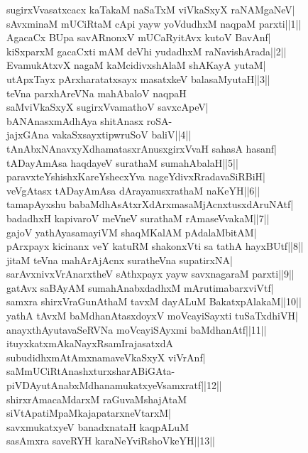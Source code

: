 \documentclass{article}
\begin{document}
sugirxVvasatxcacx kaTakaM naSaTxM viVkaSxyX raNAMgaNeV|\\
sAvxminaM mUCiRtaM cApi yayw yoVdudhxM naqpaM parxti||1||\\
AgacaCx BUpa savARnonxV mUCaRyitAvx kutoV BavAnf|\\
kiSxparxM gacaCxti mAM deVhi yudadhxM raNavishArada||2||\\
EvamukAtxvX nagaM kaMcidivxshAlaM shAKayA yutaM|\\
utApxTayx pArxharatatxsayx masatxkeV balasaMyutaH||3||\\
teVna parxhAreVNa mahAbaloV naqpaH\\
saMviVkaSxyX sugirxVvamathoV savxcApeV|\\
bANAnasxmAdhAya shitAnasx roSA-\\
jajxGAna vakaSxsayxtipwruSoV baliV||4||\\
tAnAbxNAnavxyXdhamatasxrAnusxgirxVvaH sahasA hasanf|\\
tADayAmAsa haqdayeV surathaM sumahAbalaH||5||\\
paravxteYshishxKareYshecxYva nageYdivxRradavaSiRBiH|\\
veVgAtasx tADayAmAsa dArayanusxrathaM naKeYH||6||\\
tamapAyxshu babaMdhAsAtxrXdArxmasaMjAcnxtusxdAruNAtf|\\
badadhxH kapivaroV meVneV surathaM rAmaseVvakaM||7||\\
gajoV yathAyasamayiVM shaqMKalAM pAdalaMbitAM|\\
pArxpayx kicinanx veY katuRM shakonxVti sa tathA hayxBUtf||8||\\
jitaM teVna mahArAjAcnx suratheVna supatirxNA|\\
sarAvxnivxVrAnarxtheV sAthxpayx yayw savxnagaraM parxti||9||\\
gatAvx saBAyAM sumahAnabxdadhxM mArutimabarxviVtf|\\
samxra shirxVraGunAthaM tavxM dayALuM BakatxpAlakaM||10||\\
yathA tAvxM baMdhanAtasxdoyxV moVcayiSayxti tuSaTxdhiVH|\\
anayxthAyutavaSeRVNa moVcayiSAyxmi baMdhanAtf||11||\\
ituyxkatxmAkaNayxRsamIrajasatxdA\\
subudidhxmAtAmxnamaveVkaSxyX viVrAnf|\\
saMmUCiRtAnashxturxsharABiGAta-\\
piVDAyutAnabxMdhanamukatxyeVsamxratf||12||\\
shirxrAmacaMdarxM raGuvaMshajAtaM\\
siVtApatiMpaMkajapatarxneVtarxM|\\
savxmukatxyeV banadxnataH kaqpALuM\\
sasAmxra saveRYH karaNeYviRshoVkeYH||13||\\
\end{document}
